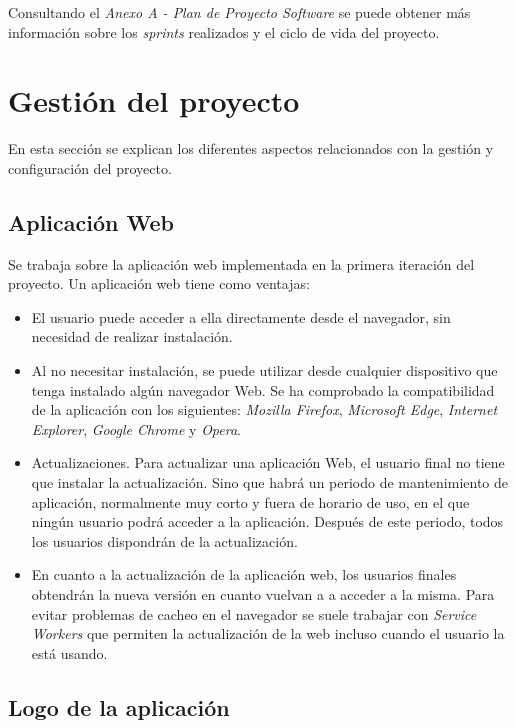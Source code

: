 Consultando el \textit{Anexo A - Plan de Proyecto Software} se puede obtener más información sobre los \textit{sprints} realizados y el ciclo de vida del proyecto.

\section{Gestión del proyecto}

En esta sección se explican los diferentes aspectos relacionados con la gestión y configuración del proyecto.

\subsection{Aplicación Web}

Se trabaja sobre la aplicación web implementada en la primera iteración del proyecto\cite{TFGPrevio}.
Un aplicación web tiene como ventajas: 
\begin{itemize}
	\tightlist
	\item El usuario puede acceder a ella directamente desde el navegador, sin necesidad de realizar instalación.
	\item  Al no necesitar instalación, se puede utilizar desde cualquier dispositivo que tenga instalado algún navegador Web. Se ha comprobado la compatibilidad de la aplicación con los siguientes: \textit{Mozilla Firefox}, \textit{Microsoft Edge}, \textit{Internet Explorer}, \textit{Google Chrome} y \textit{Opera}.
	\item Actualizaciones. Para actualizar una aplicación Web, el usuario final no tiene que instalar la actualización. Sino que habrá un periodo de mantenimiento de aplicación, normalmente muy corto y fuera de horario de uso, en el que ningún usuario podrá acceder a la aplicación. Después de este periodo, todos los usuarios dispondrán de la actualización.
	\item En cuanto a la actualización de la aplicación web, los usuarios finales obtendrán la nueva versión en cuanto vuelvan a a acceder a la misma. Para evitar problemas de cacheo en el navegador se suele trabajar con \textit{Service Workers} que permiten la actualización de la web incluso cuando el usuario la está usando.
\end{itemize}


\subsection{Logo de la aplicación}

